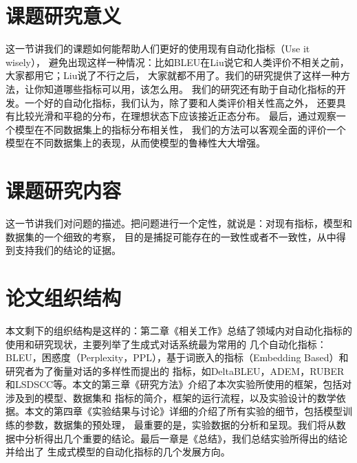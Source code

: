 \section{课题研究意义}\label{sec:课题研究意义}
这一节讲我们的课题如何能帮助人们更好的使用现有自动化指标（Use it wisely），
避免出现这样一种情况：比如BLEU在Liu说它和人类评价不相关之前，大家都用它；Liu说了不行之后，
大家就都不用了。我们的研究提供了这样一种方法，让你知道哪些指标可以用，该怎么用。
我们的研究还有助于自动化指标的开发。一个好的自动化指标，我们认为，除了要和人类评价相关性高之外，
还要具有比较光滑和平稳的分布，在理想状态下应该接近正态分布。
最后，通过观察一个模型在不同数据集上的指标分布相关性，
我们的方法可以客观全面的评价一个模型在不同数据集上的表现，从而使模型的鲁棒性大大增强。

\section{课题研究内容}\label{sec:课题研究内容}
这一节讲我们对问题的描述。把问题进行一个定性，就说是：对现有指标，模型和数据集的一个细致的考察，
目的是捕捉可能存在的一致性或者不一致性，从中得到支持我们的结论的证据。

\section{论文组织结构}\label{sec:论文组织结构}
本文剩下的组织结构是这样的：第二章《相关工作》总结了领域内对自动化指标的使用和研究现状，主要列举了生成式对话系统最为常用的
几个自动化指标：BLEU，困惑度（Perplexity，PPL），基于词嵌入的指标（Embedding Based）和研究者为了衡量对话的多样性而提出的
指标，如DeltaBLEU，ADEM，RUBER和LSDSCC等。本文的第三章《研究方法》介绍了本次实验所使用的框架，包括对涉及到的模型、数据集和
指标的简介，框架的运行流程，以及实验设计的数学依据。本文的第四章《实验结果与讨论》详细的介绍了所有实验的细节，包括模型训练的参数，数据集的预处理，
最重要的是，实验数据的分析和呈现。我们将从数据中分析得出几个重要的结论。最后一章是《总结》，我们总结实验所得出的结论并给出了
生成式模型的自动化指标的几个发展方向。
